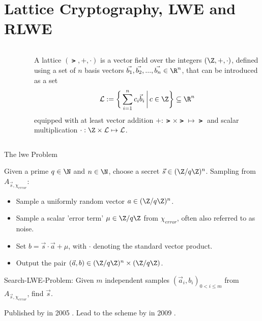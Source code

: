 \section{Lattice Cryptography, LWE and RLWE}
\begin{frame}[c]
  \begin{columns}
    \begin{column}{0.32\linewidth}
      \begin{figure}
        \centering
        \label{fig:lattice}
      \end{figure}
    \end{column}
    \begin{column}{0.6\linewidth}
      \begin{definition}[Lattice]
        A lattice $(\lat, +, \cdot)$ is a vector field over the integers $(\Z, +, \cdot)$, defined using a set of $n$ basis vectors $\vec{b_1}, \vec{b_2}, ..., \vec{b_n} \in \R^n$, that can be introduced as a set
        $$\lat := \bigg\{\sum_{i=1}^n c_i \vec{b}_i \,\bigg|\, c \in \Z\bigg\} \subseteq \R^n$$
        equipped with at least vector addition $+: \lat \times \lat \mapsto \lat$ and scalar multiplication $\cdot: \Z \times \lat \mapsto \lat$.
      \end{definition}
    \end{column}
  \end{columns}
\end{frame}

\begin{frame}{The \gls{lwe} Problem}
  \begin{definition}
    Given a prime $q \in \N$ and $n \in \N$, choose a secret $\vec{s} \in (\Z / q \Z)^n$.
    Sampling from $A_{\vec{s}, \chi_{error}}$:
    \begin{itemize}
      \item Sample a uniformly random vector $a \in (\Z/q\Z)^n$.
      \item Sample a scalar 'error term' $\mu \in \Z / q \Z$ from $\chi_{error}$, often also referred to as noise.
      \item Set $b = \vec{s} \cdot \vec{a} + \mu$, with $\cdot$ denoting the standard vector product.
      \item Output the pair $(\vec{a}, b) \in (\Z / q \Z)^n \times (\Z / q \Z)$.
    \end{itemize}
  \end{definition}

  Search-LWE-Problem:
  Given $m$ independent samples $(\vec{a}_i, b_i)_{0 < i \leq m}$ from $A_{\vec{s}, \chi_{error}}$, find $\vec{s}$.

  Published by  in 2005 \cite{2005-lwe-original}.
  Lead to the  scheme by  in 2009 \cite{2009-gentry-fhe-original}.
\end{frame}
